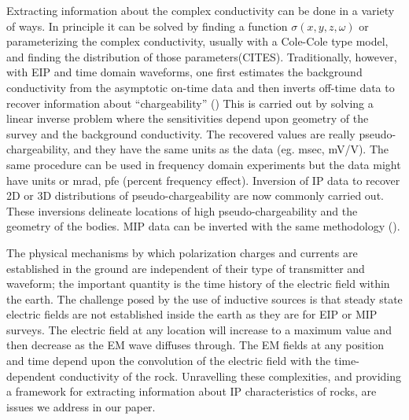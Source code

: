 \documentclass[a4paper, 11pt]{article}
\begin{document}
Extracting information about the complex conductivity can be done in a variety of ways. In principle it can be solved by finding a function $\sigma(x,y,z,\omega)$ or parameterizing the complex conductivity, usually with a Cole-Cole type model, and finding the distribution of those parameters(CITES). Traditionally, however, with EIP and time domain waveforms, one first estimates the background conductivity from the asymptotic on-time data and then inverts off-time data to recover information about ``chargeability'' (\cite{doug1994}) This is carried out by solving a linear inverse problem where the sensitivities depend upon geometry of the survey and the background conductivity. The recovered values are really pseudo-chargeability, and they have the same units as the data (eg. msec, mV/V). The same procedure can be used in frequency domain experiments but the data might have units or mrad, pfe (percent frequency effect). Inversion of IP data to recover 2D or 3D distributions of pseudo-chargeability are now commonly carried out. These inversions delineate locations of high pseudo-chargeability and the geometry of the bodies. MIP data can be inverted with the same methodology (\cite{Chen2003}). 

The physical mechanisms by which polarization charges and currents are established in the ground are independent of their type of transmitter and waveform; the important quantity is the time history of the electric field within the earth. The challenge posed by the use of  inductive sources is that steady state electric fields are not established inside the earth as they are for EIP or MIP surveys. The electric field at any location will increase to a maximum value and then decrease as the EM wave diffuses through. The EM fields at any position and time depend upon the convolution of the electric field with the time-dependent conductivity of the rock. Unravelling these complexities, and providing a framework for extracting information about IP characteristics of rocks, are issues we address in our paper. 
\end{document}
